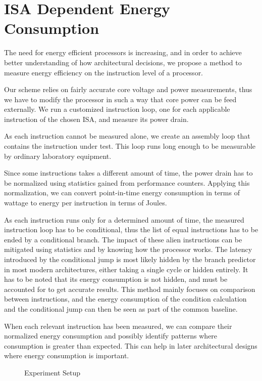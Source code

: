 \section{ISA Dependent Energy Consumption}

The need for energy efficient processors is increasing, and in order to achieve
better understanding of how architectural decisions, we propose a method to
measure energy efficiency on the instruction level of a processor.


Our scheme relies on fairly accurate core voltage and power measurements, thus
we have to modify the processor in such a way that core power can be feed
externally. We run a customized instruction loop, one for each applicable
instruction of the chosen ISA, and measure its power drain.

As each instruction cannot be measured alone, we create an assembly loop that
contains the instruction under test. This loop runs long enough to be measurable
by ordinary laboratory equipment.

Since some instructions takes a different amount of time, the power drain has to be
normalized using statistics gained from performance counters. Applying this
normalization, we can convert point-in-time energy consumption in terms of
wattage to energy per instruction in terms of Joules.

As each instruction runs only for a determined amount of time, the measured
instruction loop has to be conditional, thus the list of equal instructions has
to be ended by a conditional branch. The impact of these alien instructions
can be mitigated using statistics and by knowing how the processor works. The
latency introduced by the conditional jump is most likely hidden by the branch
predictor in most modern architectures, either taking a single cycle or hidden
entirely. It has to be noted that its energy consumption is not hidden, and must
be accounted for to get accurate results. This method mainly focuses on
comparison between instructions, and the energy consumption of the condition
calculation and the conditional jump can then be seen as part of the common
baseline.

When each relevant instruction has been measured, we can compare their
normalized energy consumption and possibly identify patterns where consumption
is greater than expected. This can help in later architectural designs where
energy consumption is important.

\begin{figure}
    
    \caption{Experiment Setup}
    \label{fig:setup}
\end{figure}



